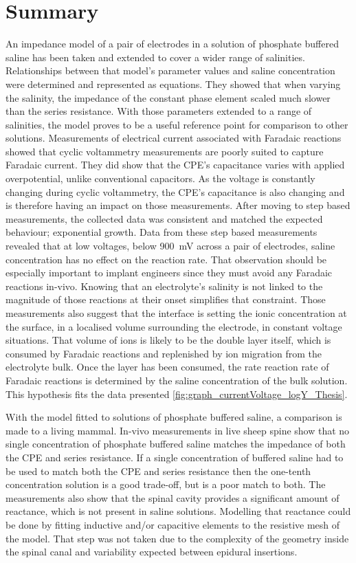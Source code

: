   \chapter{Summary}
    \label{chap:part2_summary}
    An impedance model of a pair of electrodes in a solution of phosphate buffered saline has been taken and extended to cover a wider range of salinities.
    Relationships between that model's parameter values and saline concentration were determined and represented as equations.
    They showed that when varying the salinity, the impedance of the constant phase element scaled much slower than the series resistance.
    With those parameters extended to a range of salinities, the model proves to be a useful reference point for comparison to other solutions.
    Measurements of electrical current associated with Faradaic reactions showed that cyclic voltammetry measurements are poorly suited to capture Faradaic current.
    They did show that the CPE's capacitance varies with applied overpotential, unlike conventional capacitors.
    As the voltage is constantly changing during cyclic voltammetry, the CPE's capacitance is also changing and is therefore having an impact on those measurements.
    After moving to step based measurements, the collected data was consistent and matched the expected behaviour; exponential growth.
    Data from these step based measurements revealed that at low voltages, below \SI{900}{\milli\volt} across a pair of electrodes, saline concentration has no effect on the reaction rate.
    That observation should be especially important to implant engineers since they must avoid any Faradaic reactions in-vivo.
    Knowing that an electrolyte's salinity is not linked to the magnitude of those reactions at their onset simplifies that constraint.
    Those measurements also suggest that the interface is setting the ionic concentration at the surface, in a localised volume surrounding the electrode, in constant voltage situations.
    That volume of ions is likely to be the double layer itself, which is consumed by Faradaic reactions and replenished by ion migration from the electrolyte bulk.
    Once the layer has been consumed, the rate reaction rate of Faradaic reactions is determined by the saline concentration of the bulk solution.
    This hypothesis fits the data presented \cref{fig:graph_currentVoltage_logY_Thesis}.

    With the model fitted to solutions of phosphate buffered saline, a comparison is made to a living mammal.
    In-vivo measurements in live sheep spine show that no single concentration of phosphate buffered saline matches the impedance of both the CPE and series resistance.
    If a single concentration of buffered saline had to be used to match both the CPE and series resistance then the one-tenth concentration solution is a good trade-off, but is a poor match to both.
    The measurements also show that the spinal cavity provides a significant amount of reactance, which is not present in saline solutions.
    Modelling that reactance could be done by fitting inductive and/or capacitive elements to the resistive mesh of the model.
    That step was not taken due to the complexity of the geometry inside the spinal canal and variability expected between epidural insertions.

